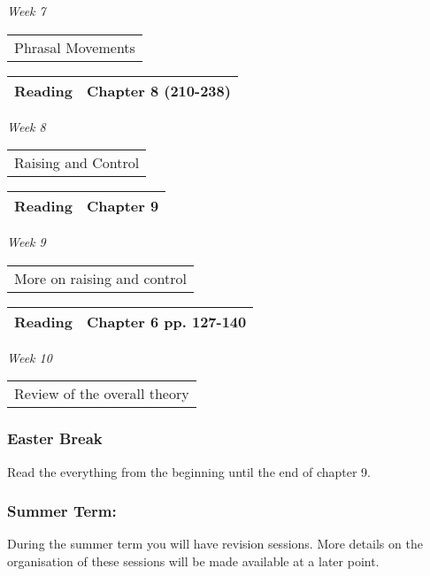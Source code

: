 \documentclass[12pt]{article}
\begin{document}
\textit{Week 7} \dotfill \begin{tabular}[t]{l} Phrasal Movements \end{tabular}
\begin{flushright}
\begin{tabular}[t]{|l|p{2in}|}\hline \textbf{Reading} & Chapter 8 (210-238) \\ \hline \end{tabular}
\end{flushright}
\textit{Week 8} \dotfill \begin{tabular}[t]{l} Raising and Control \end{tabular}
\begin{flushright}
\begin{tabular}[t]{|l|p{2in}|}\hline \textbf{Reading} & Chapter 9 \\\hline \end{tabular}
\end{flushright}
\textit{Week 9} \dotfill \begin{tabular}[t]{l} More on raising and control\\ \end{tabular}
\begin{flushright}
\begin{tabular}[t]{|l|p{2in}|}\hline \textbf{Reading} & Chapter 6 pp. 127-140 \\\hline \end{tabular}
\end{flushright}
\textit{Week 10} \dotfill \begin{tabular}[t]{l} Review of the overall theory \end{tabular}

\subsubsection*{Easter Break}  Read the everything from the beginning until the end of chapter 9.


\subsubsection*{Summer Term:} During the summer term you will have revision sessions.  More details on the organisation of these sessions will be made available at a later point.
\end{document}
